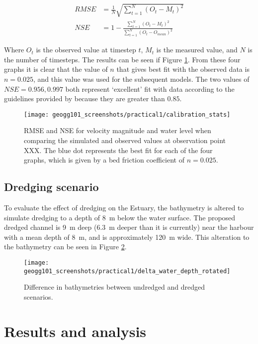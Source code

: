 \documentclass{article}
\begin{document}
\begin{align*}
    RMSE &= \frac{1}{N} \sqrt{ \sum_{t = 1}^N ( O_t - M_t) ^ 2 }\\
    NSE  &= 1 - \frac{\sum_{t = 1}^N ( O_t - M_t) ^ 2 }{\sum_{t = 1}^N ( O_t - O_{mean}) ^ 2 }
\end{align*}

Where $O_t$ is the observed value at timestep $t$, $M_t$ is the measured value, and $N$ is the number of timesteps. The results can be seen if Figure \ref{fig:calibration_stats}. From these four graphs it is clear that the value of $n$ that gives best fit with the observed data is $n = 0.025$, and this value was used for the subsequent models. The two values of $NSE = 0.956, 0.997$ both represent `excellent' fit with data according to the guidelines provided by \textcite{henriksen2008assessment} because they are greater than $0.85$. 


\begin{figure}[hbp]
    \centering
    \texttt{[image: geogg101\_screenshots/practical1/calibration\_stats]}
    \caption{RMSE and NSE for velocity magnitude and water level when comparing the simulated and observed values at observation point XXX. The blue dot represents the best fit for each of the four graphs, which is given by a bed friction coefficient of $n = 0.025$.}
    \label{fig:calibration_stats}
\end{figure}

\newpage
\subsection{Dredging scenario}

To evaluate the effect of dredging on the Estuary, the bathymetry is altered to simulate dredging to a depth of \SI{8}{m} below the water surface. The proposed dredged channel is \SI{9}{m} deep (\SI{6.3}{m} deeper than it is currently) near the harbour with a mean depth of \SI{8}{m}, and is approximately \SI{120}{m} wide. This alteration to the bathymetry can be seen in Figure \ref{fig:delta_depth}.

\begin{figure}[hbp]
    \centering
    \texttt{[image: geogg101\_screenshots/practical1/delta\_water\_depth\_rotated]}
    \caption{Difference in bathymetries between undredged and dredged scenarios.}
    \label{fig:delta_depth}
\end{figure}

\newpage
\section{Results and analysis}
\end{document}
